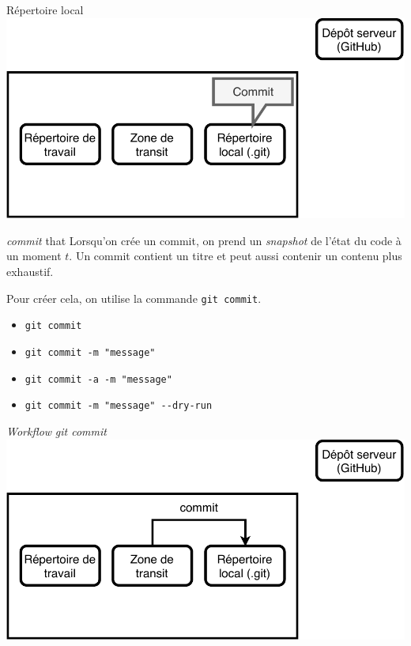 \documentclass[11pt]{beamer}
\begin{document}
\begin{frame}{Répertoire local}
	\includegraphics[width=0.95\linewidth,height=0.95\textheight,keepaspectratio]{commited.pdf}
\end{frame}

\begin{frame}[fragile]{\textit{commit} that}
	Lorsqu'on crée un commit, on prend un \textit{snapshot} de l'état du code à un moment $t$. Un commit  contient un titre et peut aussi contenir un contenu plus exhaustif.
	\bigskip
	
	Pour créer cela, on utilise la commande \verb|git commit|.
	
	\begin{itemize}[<+->]
		\item \verb|git commit|
		\item \verb|git commit -m "message"|
		\item \verb|git commit -a -m "message"|
		\item \verb|git commit -m "message" --dry-run|
	\end{itemize}
\end{frame}
\begin{frame}{\textit{Workflow} \textit{git commit}}
	\includegraphics[width=0.95\linewidth,height=0.95\textheight,keepaspectratio]{commit.pdf}
\end{frame}
\end{document}
